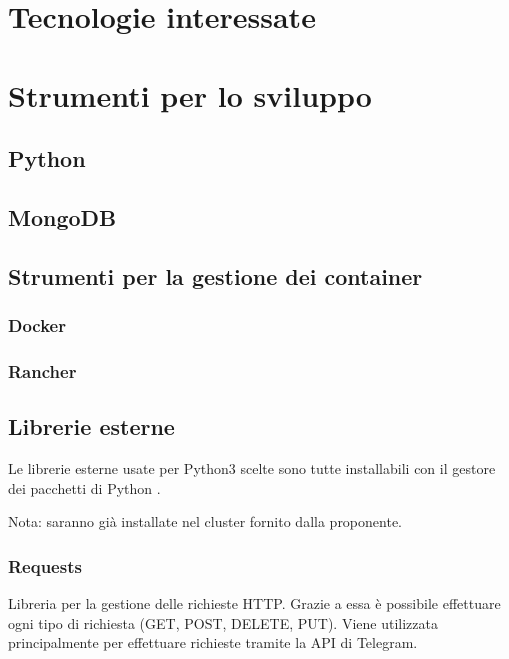 \section{Tecnologie interessate}

\section{Strumenti per lo sviluppo} %

\subsection{Python}

\subsection{MongoDB}




\subsection{Strumenti per la gestione dei container}

\subsubsection{Docker}

\subsubsection{Rancher}


\subsection{Librerie esterne}

Le librerie esterne usate per Python3 scelte sono tutte installabili con il gestore dei pacchetti di Python .

Nota: saranno già installate nel cluster fornito dalla proponente.

\subsubsection{Requests}
Libreria per la gestione delle richieste HTTP. Grazie a essa è possibile effettuare ogni tipo di richiesta (GET, POST, DELETE, PUT).
Viene utilizzata principalmente per effettuare richieste tramite la API di Telegram.

